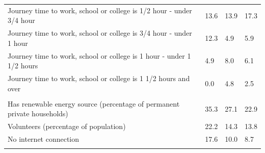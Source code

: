 \documentclass{article}
\begin{document}
\begin{table}[h]
\begin{tabular}{KTTT}
Journey time to work, school or college is 1/2 hour - under 3/4 hour & 13.6& 13.9& 17.3\\
Journey time to work, school or college is 3/4 hour - under 1 hour & 12.3&  4.9&  5.9\\
Journey time to work, school or college is 1 hour - under 1 1/2 hours & 4.9& 8.0& 6.1\\
Journey time to work, school or college is 1 1/2 hours and over & 0.0& 4.8& 2.5\\
\hline
    \\ 
    \hline
Has renewable energy source (percentage of permanent private households) & 35.3& 27.1& 22.9\\
    \hline
Volunteers (percentage of population) & 22.2& 14.3& 13.8\\
    \hline
No internet connection& 17.6& 10.0&  8.7\\
\hline
\end{tabular}
\end{table}
\end{document}
